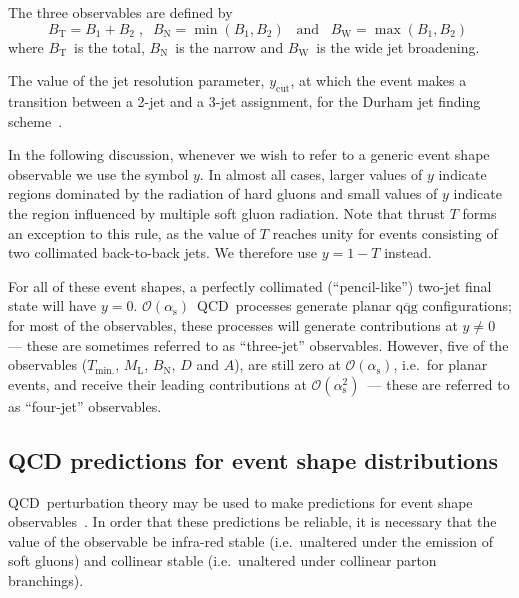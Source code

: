 \documentclass[12pt,a4paper,twoside]{article}
\newcommand{\qqbar}  {\ensuremath{\mathrm{q\overline{q}}}}
\newcommand{\oa}     {\ensuremath{\mathcal{O}(\alpha_{\mathrm{s}})}}
\newcommand{\oaa}    {\ensuremath{\mathcal{O}(\alpha_{\mathrm{s}}^2)}}
\newcommand{\bt}     {\ensuremath{B_{\mathrm{T}}}}
\newcommand{\bw}     {\ensuremath{B_{\mathrm{W}}}}
\newcommand{\bn}     {\ensuremath{B_{\mathrm{N}}}}
\newcommand{\ml}     {\ensuremath{M_{\mathrm{L}}}}
\newcommand{\thr}    {\ensuremath{1-T}}
\newcommand{\tmi}    {\ensuremath{T_{\mathrm{min.}}}}
\newcommand{\ycut}   {\ensuremath{y_{\mathrm{cut}}}}
\newcommand{\ytwothree}   {\ensuremath{y^{\mathrm{D}}_{23}}}
\newcommand{\qcd}{\mbox{QCD}}
\begin{document}
\begin{description}
  The three observables \cite{nllabtbw} are defined by
  \begin{equation}
    \bt= B_1+B_2\;,\;\;\bn= \min(B_1,B_2)\;\;\;\mathrm{and}
\;\;\;\bw= \max(B_1,B_2)\;
  \end{equation}
  where \bt\ is the total, \bn\ is the narrow and 
\bw\ is the wide jet broadening.
\item[Transition value between 2 and 3 jets {\boldmath \ytwothree}:]
  The value of the jet resolution parameter, \ycut, 
  at which the
  event makes a transition between a  2-jet and a 3-jet assignment,
  for the Durham jet finding scheme~\cite{durham}.
\end{description}
 
In the following discussion, whenever we wish to
 refer to  a generic event shape observable we use the symbol $y$. 
In almost all cases, 
larger values of $y$ indicate regions
dominated by the radiation of hard gluons and small values of $y$
indicate the region influenced by multiple soft gluon radiation. 
Note that thrust $T$ forms an exception to this rule, as the value
of $T$ reaches unity for events consisting of two collimated
back-to-back jets. We therefore use $y=\thr$ instead. 

For all of these event shapes, a perfectly collimated 
(``pencil-like'') two-jet
final state will have $y=0$.  
\oa\ \qcd\ processes generate planar $\qqbar\mathrm{g}$
configurations; for most of the observables, 
these processes will generate contributions
at $y\neq0$ --- these are sometimes referred to as ``three-jet'' 
observables.  However,
five of the observables (\tmi, \ml, \bn, $D$ and $A$), 
are still zero at \oa, i.e.\ for planar events, 
and receive their leading contributions 
at \oaa\ --- these are referred to as ``four-jet'' observables.  

\subsection{QCD predictions for event shape distributions}
\label{sec-theocalc}
\qcd\ perturbation theory may be used to make predictions
for event shape observables~\cite{ESW}.  In order that these predictions
be reliable, it is necessary that the value of the observable be 
infra-red stable (i.e.\ unaltered under the emission of soft gluons)
and collinear stable (i.e.\ unaltered under collinear parton branchings).
\end{document}
